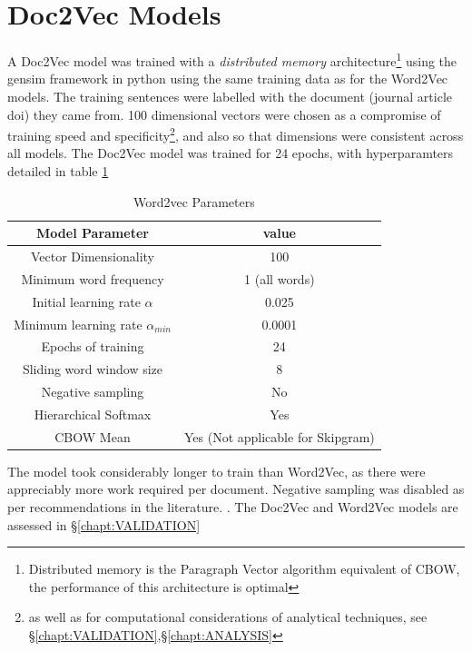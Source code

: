 \section{Doc2Vec Models}
A Doc2Vec model was trained with a \emph{distributed memory} architecture\footnote{Distributed memory is the Paragraph Vector algorithm equivalent of CBOW, the performance of this architecture is optimal\cite{doc2vec}} using the gensim framework in python \cite{gensim} using the same training data as for the Word2Vec models. The training sentences were labelled with the document (journal article doi) they came from. 100 dimensional vectors were chosen as a compromise of training speed and specificity\footnote{as well as for computational considerations of analytical techniques, see \S\ref{chapt:VALIDATION},\S\ref{chapt:ANALYSIS}}, and also so that dimensions were consistent across all models. The Doc2Vec model was trained for 24 epochs, with hyperparamters detailed in table \ref{tab:doc2vechyperparams}
\begin{table}[H]
\begin{center}
\label{tab:doc2vechyperparams}
\caption{Word2vec Parameters}
\begin{tabular}{||c|c||}
\hline
Model Parameter & value\\
\hline
Vector Dimensionality & 100\\
Minimum word frequency & 1 (all words)\\
Initial learning rate $\alpha$ & 0.025 \\
Minimum learning rate $\alpha_{min}$&0.0001\\
Epochs of training & 24\\
Sliding word window size & 8\\
Negative sampling & No \\
Hierarchical Softmax & Yes\\
CBOW Mean & Yes (Not applicable for Skipgram) \\
\hline
\end{tabular}
\end{center}
\end{table}

The model took considerably longer to train than Word2Vec, as there were appreciably more work required per  document. Negative sampling was disabled as per recommendations in the literature. \cite{gensim} \cite{doc2vec}.
The Doc2Vec and Word2Vec models are assessed in  \S\ref{chapt:VALIDATION}
